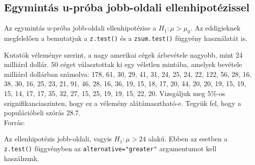 \documentclass[
]{book}
\providecommand{\tightlist}{%
  \setlength{\itemsep}{0pt}\setlength{\parskip}{0pt}}
\begin{document}
\hypertarget{egymintuxe1s-u-pruxf3ba-jobb-oldali-ellenhipotuxe9zissel}{%
\subsection{Egymintás u-próba jobb-oldali ellenhipotézissel}\label{egymintuxe1s-u-pruxf3ba-jobb-oldali-ellenhipotuxe9zissel}}

Az egymintás u-próba jobb-oldali ellenhipotézise a \(H_1:\mu > \mu_0\). Az eddigieknek megfelelően a bemutatjuk a \texttt{z.test()} és a \texttt{zsum.test()} függvény használatát is.

\begin{description}
\tightlist
\item[Példa. Amerikai nagyvállalatok átlagos árbevétele.]
Kutatók véleménye szerint, a nagy amerikai cégek árbevétele nagyobb, mint 24 milliárd dollár. 50 céget választottak ki egy véletlen mintába, amelyek bevétele milliárd dollárban számolva: 178, 61, 30, 29, 41, 31, 24, 25, 24, 22, 122, 56, 28, 16, 38, 30, 16, 25, 23, 21, 91, 46, 28, 16, 36, 19, 15, 18, 17, 20, 44, 20, 20, 19, 15, 19, 15, 14, 17, 17, 35, 32, 27, 15, 25, 19, 19, 15, 22, 20. Vizsgáljuk meg 5\%-os szignifikanciaszinten, hogy ez a vélemény alátámasztható-e. Tegyük fel, hogy a populációbeli szórás 28.7.\\
Forrás:
\end{description}

Az ellenhipotézis jobb-oldali, vagyis \(H_1:\mu>24\) alakú. Ebben az esetben a \texttt{z.test()} függvényben az \texttt{alternative="greater"} argumentumot kell haszálnunk.
\end{document}
